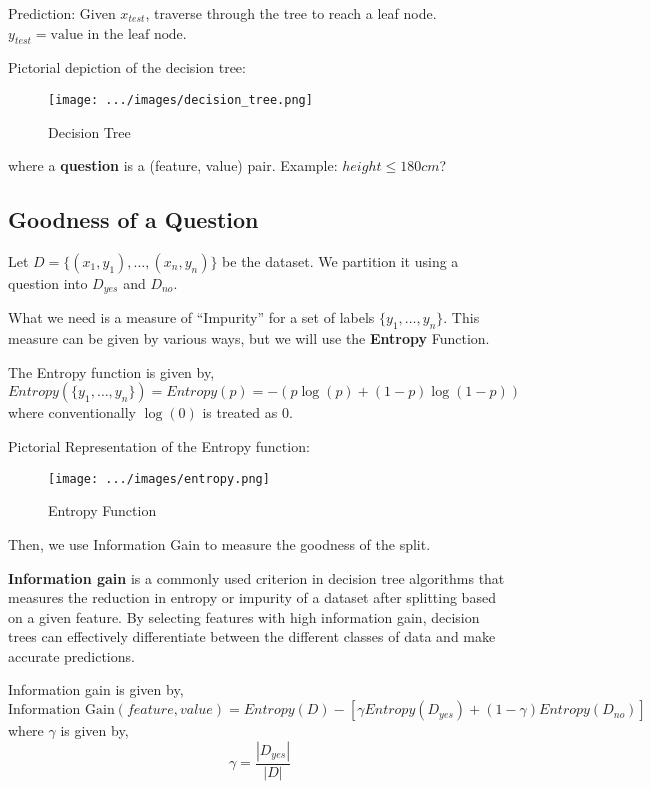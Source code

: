 \documentclass[
]{article}
\begin{document}
Prediction: Given \(x_{test}\), traverse through the tree to reach a
leaf node. \(y_{test} = \text{value in the leaf node}\).

Pictorial depiction of the decision tree:

\begin{figure}
\centering
\texttt{[image: .../images/decision\_tree.png]}
\caption{Decision Tree}
\end{figure}

where a \textbf{question} is a (feature, value) pair. Example:
\(height\le180cm\)?

\hypertarget{goodness-of-a-question}{%
\subsection{Goodness of a Question}\label{goodness-of-a-question}}

Let \(D=\{(x_1, y_1), \ldots, (x_n,y_n)\}\) be the dataset. We partition
it using a question into \(D_{yes}\) and \(D_{no}\).

What we need is a measure of ``Impurity'' for a set of labels
\(\{y_1, \ldots, y_n\}\). This measure can be given by various ways, but
we will use the \textbf{Entropy} Function.

The Entropy function is given by, \[
Entropy(\{y_1, \ldots, y_n\}) = Entropy(p) = -\left( p\log(p)+(1-p)\log(1-p) \right )
\] where conventionally \(\log(0)\) is treated as \(0\).

Pictorial Representation of the Entropy function:

\begin{figure}
\centering
\texttt{[image: .../images/entropy.png]}
\caption{Entropy Function}
\end{figure}

Then, we use Information Gain to measure the goodness of the split.

\textbf{Information gain} is a commonly used criterion in decision tree
algorithms that measures the reduction in entropy or impurity of a
dataset after splitting based on a given feature. By selecting features
with high information gain, decision trees can effectively differentiate
between the different classes of data and make accurate predictions.

Information gain is given by, \[
\text{Information Gain}(feature,value)=Entropy(D) - \left [ \gamma Entropy(D_{yes})+(1-\gamma)Entropy(D_{no}) \right ]
\] where \(\gamma\) is given by, \[
\gamma=\frac{|D_{yes}|}{|D|}
\]
\end{document}
